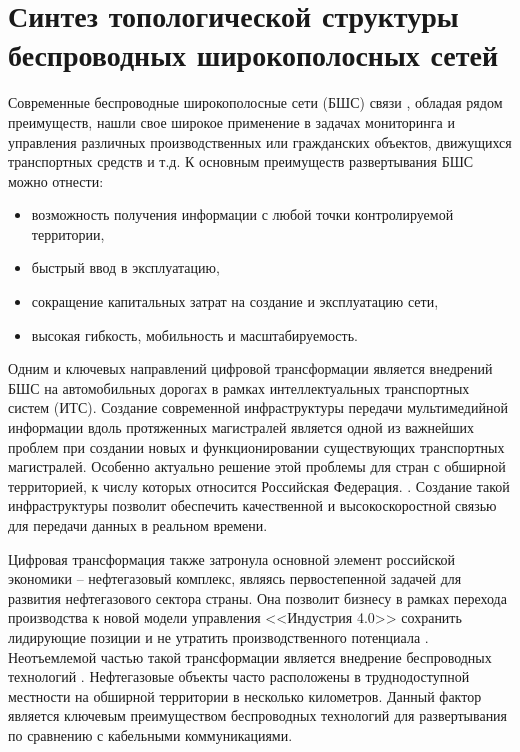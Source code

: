 \chapter{Синтез топологической структуры беспроводных широкополосных сетей}\label{ch:ch1}

Современные беспроводные широкополосные сети (БШС) связи , обладая рядом преимуществ, нашли свое широкое применение в задачах мониторинга и управления различных   производственных или гражданских объектов, движущихся транспортных средств и т.д. К основным преимуществ развертывания БШС можно отнести:

\begin{itemize}
  \item  возможность получения информации с любой точки контролируемой территории,
  \item быстрый ввод в эксплуатацию,
  \item сокращение капитальных затрат на создание и эксплуатацию сети,
  \item высокая гибкость, мобильность и масштабируемость. 
\end{itemize}


Одним и ключевых направлений цифровой трансформации является внедрений БШС на автомобильных дорогах в рамках интеллектуальных транспортных систем (ИТС). Создание современной инфраструктуры передачи мультимедийной информации  вдоль протяженных магистралей является одной из важнейших проблем при создании новых и функционировании существующих транспортных магистралей. Особенно актуально решение этой проблемы для стран с обширной территорией, к числу которых относится Российская Федерация. \cite{Vish2015}. Создание такой инфраструктуры позволит обеспечить качественной и высокоскоростной связью для передачи данных в реальном времени. 





Цифровая трансформация также затронула основной элемент российской экономики -- нефтегазовый комплекс, являясь первостепенной задачей  для развития  нефтегазового сектора страны. Она позволит бизнесу в рамках перехода производства к новой модели управления <<Индустрия 4.0>> сохранить лидирующие позиции и не утратить производственного потенциала  \cite{Eremin2020, Dmitrievskiy2020}. Неотъемлемой частью такой трансформации является внедрение беспроводных технологий \cite{Eremin2020, Dmitrievskiy2020, Eremin2019, Hiriyannaiah2020, Munirathinam2020, CarmenLucas-Estan2018, Lu2019}. Нефтегазовые объекты часто расположены в труднодоступной местности на обширной территории в несколько километров. Данный фактор является ключевым преимуществом беспроводных технологий для развертывания по сравнению с кабельными коммуникациями.

